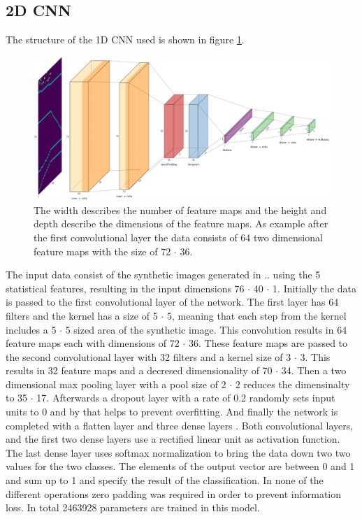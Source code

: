 \subsection{2D CNN}
The structure of the 1D CNN used is shown in figure \ref{fig:2dCnnStructure}.
\begin{figure}[H]
	\centering
	\includegraphics[width=15cm]{images/2dCnnStructure_new.png}
	\caption[Bild kurz]{The width describes the number of feature maps and the height and depth describe the dimensions of the feature maps. As example after the first convolutional layer the data consists of 64 two dimensional feature maps with the size of 72 $\cdot$ 36.}
	\label{fig:2dCnnStructure}
\end{figure}
The input data consist of the synthetic images generated in ..  using the 5 statistical features, resulting in the input dimensions 76 $\cdot$ 40 $\cdot$ 1. Initially the data is passed to the first convolutional layer of the network. The first layer has 64 filters and the kernel has a size of 5 $\cdot$ 5, meaning that each step from the kernel includes a 5 $\cdot$ 5 sized area of the synthetic image. This convolution results in 64 feature maps each with dimensions of 72 $\cdot$ 36. These feature maps are passed to the second convolutional layer with 32 filters and a kernel size of 3 $\cdot$ 3. This results in 32 feature maps and a decresed dimensionality of 70 $\cdot$ 34. Then a two dimensional max pooling layer with a pool size of 2 $\cdot$ 2 reduces the dimensinalty to 35 $\cdot$ 17. Afterwards a dropout layer with a rate of 0.2 randomly sets input units to 0 and by that helps to prevent overfitting. And finally the network is completed with a flatten layer and three dense layers . Both convolutional layers, and the first two dense layers use a rectified linear unit as activation function. The last dense layer uses softmax normalization to bring the data down two two values for the two classes. The elements of the output vector are between 0 and 1 and sum up to 1 and specify the result of the classification. In none of the different operations zero padding was required in order to prevent information loss. In total 2463928 parameters are trained in this model.


